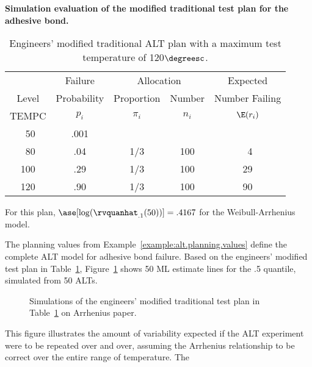 \begin{example}
{\bf Simulation evaluation of the modified traditional test
plan for the adhesive bond.} 
\label{example:adh.bond.mod.trad.plan}
\begin{table}
\caption{Engineers' modified traditional ALT 
plan with a maximum test temperature of 120$\degreesc$.}
\centering\small
\begin{tabular}{ccccc}
\\[-.5ex]
\hline
& Failure & \multicolumn{2}{c}{Allocation} & Expected    \\ \cline{3-4}
Level& Probability & Proportion & Number & Number Failing\\
TEMPC     & $p_{i}$  & $\pi_{i}$ &$n_{i}$ & $\E(r_{i})$ \\
\hline
\mbox{ 50}& .001  &      &      &      \\
\mbox{ 80}& .04   & 1/3  & 100 & \mbox{ 4} \\
\mbox{100}& .29   & 1/3  & 100 & \mbox{29} \\
\mbox{120}& .90   & 1/3  & 100 & \mbox{90} \\
\hline
\end{tabular}
\begin{minipage}[t]{4.5in}
For this plan, $\ase[\log(\rvquanhat_{.1}(50))]= .4167 $
for the Weibull-Arrhenius model.
\end{minipage}
\label{table:alt.plan.mod.trad.plan}
\end{table}
The planning values from Example~\ref{example:alt.planning.values}
define the complete ALT model for adhesive bond failure. Based on
the engineers' modified test plan in 
Table~\ref{table:alt.plan.mod.trad.plan},
Figure~\ref{figure:advbond.plan1.sim.ps} shows 50 ML estimate lines
for the .5 quantile, simulated from 50 ALTs.
\begin{figure}
\caption{Simulations of the engineers' modified traditional
test plan in Table~\ref{table:alt.plan.mod.trad.plan} on Arrhenius paper.}
\label{figure:advbond.plan1.sim.ps}
\end{figure}
%
This figure illustrates the amount of variability expected if the ALT
experiment were to be repeated over and over, assuming the Arrhenius
relationship to be correct over the entire range of temperature.  The

\end{example}
